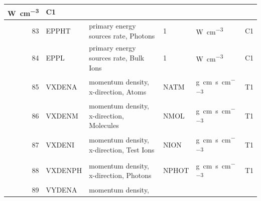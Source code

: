 \begin{landscape}
\begin{longtable}{|r|l|l|l|l|c|}
    \si{\watt\per\cubic\centi\metre}                               & C1
    \\ \hline
    83                                                             & EPPHT
                                                                   & primary energy sources
    rate, Photons                                                  & 1                         &
    \si{\watt\per\cubic\centi\metre}                               & C1
    \\ \hline
    84                                                             & EPPL
                                                                   & primary energy sources
    rate, Bulk Ions                                                & 1                         &
    \si{\watt\per\cubic\centi\metre}                               & C1
    \\ \hline
    85                                                             & VXDENA
                                                                   & momentum density,
    x-direction, Atoms                                             & NATM                      &
    \si{\gram\centi\metre\per\second\per\cubic\centi\metre}        & T1
    \\ \hline
    86                                                             & VXDENM
                                                                   & momentum density,
    x-direction, Molecules                                         & NMOL                      &
    \si{\gram\centi\metre\per\second\per\cubic\centi\metre}        & T1
    \\ \hline
    87                                                             & VXDENI
                                                                   & momentum density,
    x-direction, Test Ions                                         & NION                      &
    \si{\gram\centi\metre\per\second\per\cubic\centi\metre}        & T1
    \\ \hline
    88                                                             & VXDENPH
                                                                   & momentum density,
    x-direction, Photons                                           & NPHOT                     &
    \si{\gram\centi\metre\per\second\per\cubic\centi\metre}        & T1
    \\ \hline
    89                                                             & VYDENA
                                                                   & momentum density,

\end{longtable}
\end{landscape}
